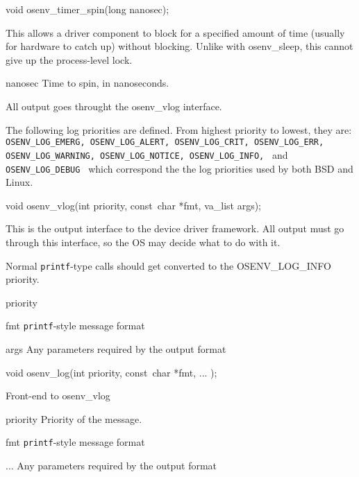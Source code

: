 \begin{apisyn}
	\funcproto void osenv_timer_spin(long nanosec);
\end{apisyn}
\drvtoosn
\begin{apidesc}
	This allows a driver component to block for a specified amount
	of time (usually for hardware to catch up) without blocking.
	Unlike with osenv_sleep,
	this cannot give up the process-level lock.
\end{apidesc}
\begin{apiparm}
	\item[nanosec]
		Time to spin, in nanoseconds.
\end{apiparm}





All output goes throught the osenv_vlog interface.

The following log priorities are defined.
From highest priority to lowest, they are:
{\tt
OSENV_LOG_EMERG,
OSENV_LOG_ALERT,
OSENV_LOG_CRIT,
OSENV_LOG_ERR,
OSENV_LOG_WARNING,
OSENV_LOG_NOTICE,
OSENV_LOG_INFO,
}
and
{\tt
OSENV_LOG_DEBUG
}
which correspond the the log priorities used by both BSD and Linux.


\begin{apisyn}
	\funcproto void osenv_vlog(int priority, const~char *fmt, va_list args);
\end{apisyn}
\drvtoosn
\begin{apidesc}
	This is the output interface to the device driver framework.
	All output must go through this interface, so the OS may
	decide what to do with it.

	Normal {\tt printf}-type calls should get converted to the
	OSENV_LOG_INFO priority.
\end{apidesc}
\begin{apiparm}
	\item[priority]
	\item[fmt]
		{\tt printf}-style message format
	\item[args]
		Any parameters required by the output format
\end{apiparm}


\begin{apisyn}
	\funcproto void osenv_log(int priority, const~char *fmt, ... \unskip);
\end{apisyn}
\drvtoosn
\begin{apidesc}

	Front-end to osenv_vlog
\end{apidesc}
\begin{apiparm}
	\item[priority]
		Priority of the message.
	\item[fmt]
		{\tt printf}-style message format
	\item[...]
		Any parameters required by the output format
\end{apiparm}



